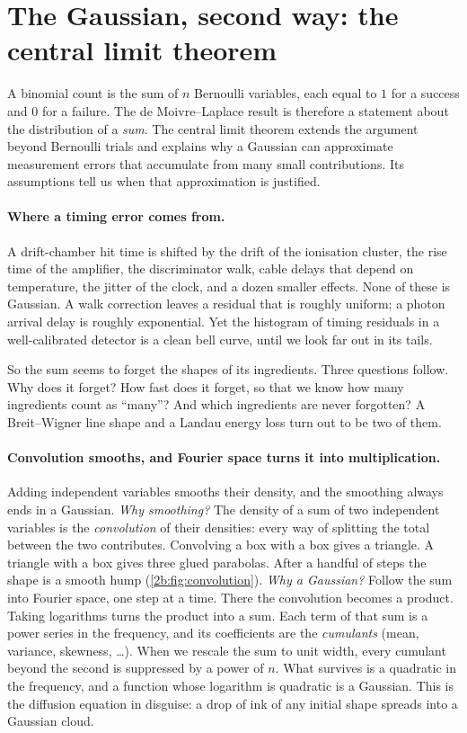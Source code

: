 \section{The Gaussian, second way: the central limit theorem}
\label{2b:sec:clt}

A binomial count is the sum of $n$ Bernoulli variables, each equal to $1$ for a success and $0$ for a failure. The de Moivre--Laplace result is therefore a statement about the distribution of a \emph{sum}. The central limit theorem extends the argument beyond Bernoulli trials and explains why a Gaussian can approximate measurement errors that accumulate from many small contributions. Its assumptions tell us when that approximation is justified.

\paragraph{Where a timing error comes from.}
A drift-chamber hit time is shifted by the drift of the ionisation cluster, the rise time of the amplifier, the discriminator walk, cable delays that depend on temperature, the jitter of the clock, and a dozen smaller effects. None of these is Gaussian. A walk correction leaves a residual that is roughly uniform; a photon arrival delay is roughly exponential. Yet the histogram of timing residuals in a well-calibrated detector is a clean bell curve, until we look far out in its tails.

So the sum seems to forget the shapes of its ingredients. Three questions follow. Why does it forget? How fast does it forget, so that we know how many ingredients count as ``many''? And which ingredients are never forgotten? A Breit--Wigner line shape and a Landau energy loss turn out to be two of them.

\paragraph{Convolution smooths, and Fourier space turns it into multiplication.}
Adding independent variables smooths their density, and the smoothing always ends in a Gaussian. \emph{Why smoothing?} The density of a sum of two independent variables is the \emph{convolution} of their densities: every way of splitting the total between the two contributes. Convolving a box with a box gives a triangle. A triangle with a box gives three glued parabolas. After a handful of steps the shape is a smooth hump (\cref{2b:fig:convolution}). \emph{Why a Gaussian?} Follow the sum into Fourier space, one step at a time. There the convolution becomes a product. Taking logarithms turns the product into a sum. Each term of that sum is a power series in the frequency, and its coefficients are the \emph{cumulants} (mean, variance, skewness, \dots). When we rescale the sum to unit width, every cumulant beyond the second is suppressed by a power of $n$. What survives is a quadratic in the frequency, and a function whose logarithm is quadratic is a Gaussian. This is the diffusion equation in disguise: a drop of ink of any initial shape spreads into a Gaussian cloud.

